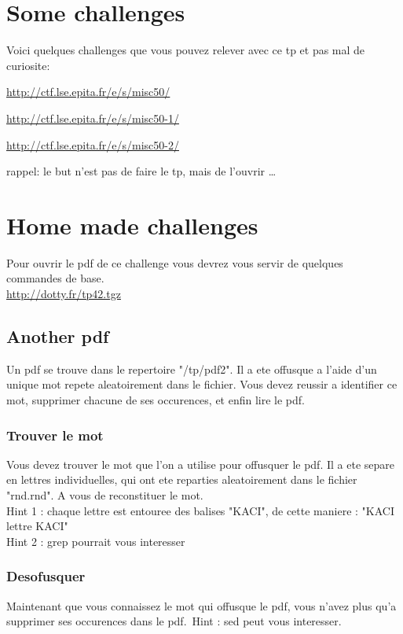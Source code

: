 \documentclass[a4paper]{article}
\begin{document}
\section{Some challenges}
Voici quelques challenges que vous pouvez relever avec ce tp et pas mal de
curiosite:



\url{http://ctf.lse.epita.fr/e/s/misc50/}

\url{http://ctf.lse.epita.fr/e/s/misc50-1/}

\url{http://ctf.lse.epita.fr/e/s/misc50-2/} \
\

rappel: le but n'est pas de faire le tp, mais de l'ouvrir \dots


\section{Home made challenges}

Pour ouvrir le pdf de ce challenge vous devrez vous servir de quelques commandes de base.\\


\url{http://dotty.fr/tp42.tgz}

\subsection{Another pdf}
Un pdf se trouve dans le repertoire "/tp/pdf2". Il a ete offusque a l'aide d'un unique mot repete aleatoirement dans le fichier. Vous devez reussir a identifier ce mot, supprimer chacune de ses occurences, et enfin lire le pdf.\\

\subsubsection{Trouver le mot}
Vous devez trouver le mot que l'on a utilise pour offusquer le pdf. Il a ete separe en lettres individuelles, qui ont ete reparties aleatoirement dans le fichier "rnd.rnd".
A vous de reconstituer le mot.\\
Hint 1 : chaque lettre est entouree des balises "KACI", de cette maniere : "KACI lettre KACI"\\
Hint 2 : grep pourrait vous interesser

\subsubsection{Desofusquer}
Maintenant que vous connaissez le mot qui offusque le pdf, vous n'avez plus qu'a supprimer ses occurences dans le pdf.\
Hint : sed peut vous interesser.
\end{document}
